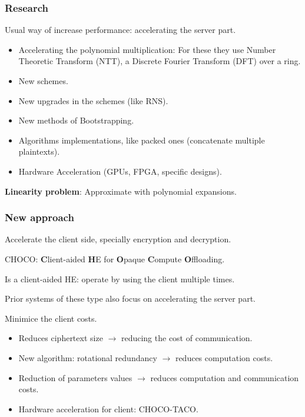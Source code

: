 \documentclass[10pt,handout]{beamer}
\begin{document}
\begin{frame}
\frametitle{Research}

    Usual way of increase performance:  accelerating the server part.
\begin{itemize}\itemsep-0.7em
   \item Accelerating the polynomial multiplication:
    For these they use Number Theoretic Transform (NTT), a Discrete Fourier Transform (DFT) over a ring.
   \item New schemes.
   \item New upgrades in the schemes (like RNS).
   \item New methods of Bootstrapping.
   \item Algorithms implementations, like packed ones (concatenate multiple plaintexts).
   \item Hardware Acceleration (GPUs, FPGA, specific designs).
\end{itemize}

    \textbf{Linearity problem}: Approximate with polynomial expansions.
\end{frame}


\begin{frame}
\frametitle{New approach}
Accelerate the client side, specially encryption and decryption.

CHOCO: \textbf{C}lient-aided \textbf{H}E for \textbf{O}paque \textbf{C}ompute \textbf{O}ffloading.

Is a client-aided HE: operate by using the client multiple times.

Prior systems of these type also focus on accelerating the server part.

    Minimice the client costs.
\begin{itemize}\itemsep-0.7em
    \item Reduces ciphertext size $\rightarrow$ reducing the cost of communication.
    \item New algorithm: rotational redundancy $\rightarrow$ reduces computation costs.
    \item Reduction of parameters values $\rightarrow$ reduces computation and communication costs.
    \item Hardware acceleration for client: CHOCO-TACO.
\end{itemize}

\end{frame}
\end{document}
